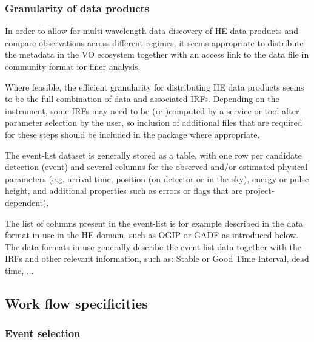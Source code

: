 \documentclass[11pt,a4paper]{ivoa}
\begin{document}
\subsubsection{Granularity of data products}

In order to allow for multi-wavelength data discovery of HE data products and compare observations across different
regimes, it seems appropriate to distribute the metadata in the VO ecosystem together with an access link to the data
file in community format for finer analysis.

Where feasible, the efficient granularity for distributing HE data products seems to be the full combination of data
and associated IRFs. Depending on the instrument, some IRFs may need to be (re-)computed by a service or tool after
parameter selection by the user, so inclusion of additional files that are required for these steps should be included
in the package where appropriate.


The event-list dataset is generally stored as a table, with one row per candidate detection (event) and several columns
for the observed and/or estimated physical parameters (e.g. arrival time, position (on detector or in the sky), energy
or pulse height, and additional properties such as errors or flags that are project-dependent).

The list of columns present in the event-list is for example described in the data format in use in the HE domain,
such as OGIP or GADF as introduced below. The data formats in use generally describe the event-list data together with
the IRFs and other relevant information, such as: Stable or Good Time Interval, dead time, ...



\subsection{Work flow specificities}

\subsubsection{Event selection}
\end{document}
